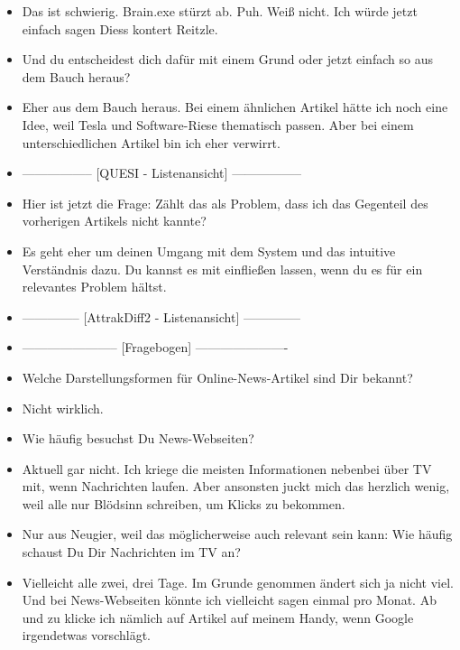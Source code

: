 {\begin{itemize}[]
        \item {} Das ist schwierig.
              Brain.exe stürzt ab.
              Puh.
              Weiß nicht.
              Ich würde jetzt einfach sagen Diess kontert Reitzle.
        \item {} Und du entscheidest dich dafür mit einem Grund oder jetzt einfach so aus dem Bauch heraus?
        \item {} Eher aus dem Bauch heraus.
              Bei einem ähnlichen Artikel hätte ich noch eine Idee, weil Tesla und Software-Riese thematisch passen.
              Aber bei einem unterschiedlichen Artikel bin ich eher verwirrt.
        \item {-----------------} [QUESI - Listenansicht] {-----------------}
        \item {} Hier ist jetzt die Frage: Zählt das als Problem, dass ich das Gegenteil des vorherigen Artikels nicht kannte?
        \item {} Es geht eher um deinen Umgang mit dem System und das intuitive Verständnis dazu.
              Du kannst es mit einfließen lassen, wenn du es für ein relevantes Problem hältst.
        \item {--------------} [AttrakDiff2 - Listenansicht] {--------------}
        \item {-----------------------} [Fragebogen] {----------------------}
        \item {} Welche Darstellungsformen für Online-News-Artikel sind Dir bekannt?
        \item {} Nicht wirklich.
        \item {} Wie häufig besuchst Du News-Webseiten?
        \item {} Aktuell gar nicht.
              Ich kriege die meisten Informationen nebenbei über TV mit, wenn Nachrichten laufen.
              Aber ansonsten juckt mich das herzlich wenig, weil alle nur Blödsinn schreiben, um Klicks zu bekommen.
        \item {} Nur aus Neugier, weil das möglicherweise auch relevant sein kann: Wie häufig schaust Du Dir Nachrichten im TV an?
        \item {} Vielleicht alle zwei, drei Tage. Im Grunde genommen ändert sich ja nicht viel.
              Und bei News-Webseiten könnte ich vielleicht sagen einmal pro Monat.
              Ab und zu klicke ich nämlich auf Artikel auf meinem Handy, wenn Google irgendetwas vorschlägt.

\end{itemize}}
